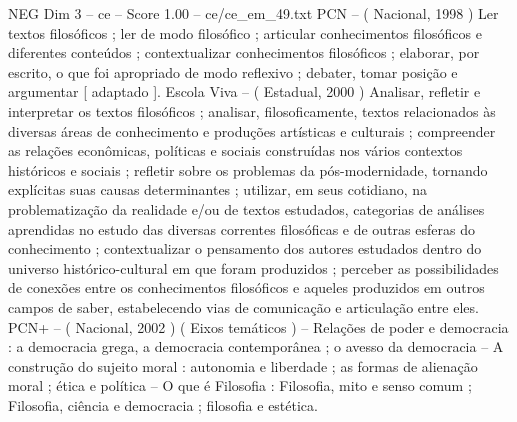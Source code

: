 \begin{textsample}{NEG Dim 3 – ce – Score 1.00 – ce/ce\_em\_49.txt}  \label{ex:f3_neg_231}
PCN – ( Nacional, 1998 ) Ler textos filosóficos ; ler de modo filosófico ; articular conhecimentos filosóficos e diferentes conteúdos ; contextualizar conhecimentos filosóficos ; elaborar, por escrito, o que foi apropriado de modo reflexivo ; debater, tomar posição e argumentar [ adaptado ].
Escola Viva – ( Estadual, 2000 ) Analisar, refletir e interpretar os textos filosóficos ; analisar, filosoficamente, textos relacionados às diversas áreas de conhecimento e produções artísticas e culturais ; compreender as relações econômicas, políticas e sociais construídas nos vários contextos históricos e sociais ; refletir sobre os problemas da pós-modernidade, tornando explícitas suas causas determinantes ; utilizar, em seus cotidiano, na problematização da realidade e/ou de textos estudados, categorias de análises aprendidas no estudo das diversas correntes filosóficas e de outras esferas do conhecimento ; contextualizar o pensamento dos autores estudados dentro do universo histórico-cultural em que foram produzidos ; perceber as possibilidades de conexões entre os conhecimentos filosóficos e aqueles produzidos em outros campos de saber, estabelecendo vias de comunicação e articulação entre eles.
PCN+ – ( Nacional, 2002 ) ( Eixos temáticos ) – Relações de poder e democracia : a democracia grega, a democracia contemporânea ; o avesso da democracia – A construção do sujeito moral : autonomia e liberdade ; as formas de alienação moral ; ética e política – O que é Filosofia : Filosofia, mito e senso comum ; Filosofia, ciência e democracia ; filosofia e estética.

\end{textsample}
